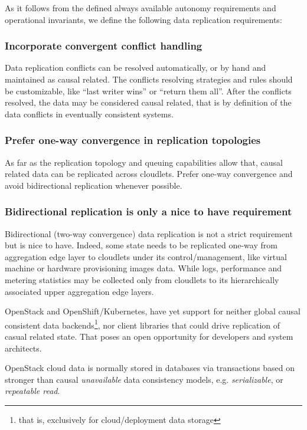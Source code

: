 \documentclass[conference]{IEEEtran}
\begin{document}
As it follows from the defined always available autonomy requirements and
operational invariants, we define the following data replication requirements:

\subsubsection{Incorporate convergent conflict handling\cite{b1}}

Data replication conflicts can be resolved automatically, or by hand and
maintained as causal related. The conflicts resolving strategies and rules
should be customizable, like ``last writer wins'' or ``return them all''. After
the conflicts resolved, the data may be considered causal related, that is by
definition\cite{b1} of the data conflicts in eventually consistent systems.

\subsubsection{Prefer one-way convergence in replication topologies}

As far as the replication topology and queuing capabilities allow
that, causal related data can be replicated across cloudlets. Prefer one-way
convergence and avoid bidirectional replication whenever possible.

\subsubsection{Bidirectional replication is only a nice to have requirement}

Bidirectional (two-way convergence) data replication is not a strict
requirement but is nice to have. Indeed, some state needs to be replicated
one-way from aggregation edge layer to cloudlets under its control/management,
like virtual machine or hardware provisioning images data. While logs,
performance and metering statistics may be collected only from cloudlets to its
hierarchically associated upper aggregation edge layers.

OpenStack and OpenShift/Kubernetes, have yet support for neither global causal
consistent data backends\footnote{that is, exclusively for cloud/deployment
data storage}, nor client libraries that could drive replication of casual
related state. That poses an open opportunity for developers and system
architects.

OpenStack cloud data is normally stored in databases via
transactions based on stronger than causal \textit{unavailable}\cite{b4} data
consistency models, e.g. \textit{serializable}\cite{b4}, or \textit{repeatable
read}\cite{b4}.
\end{document}

